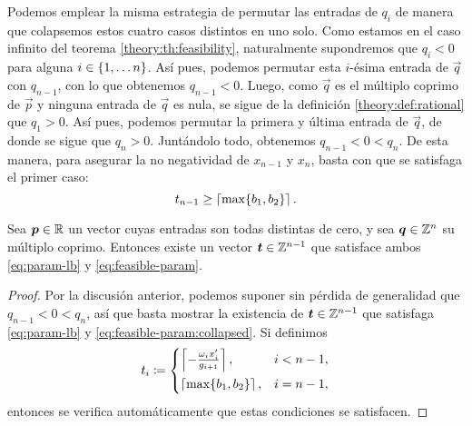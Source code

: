 Podemos emplear la misma estrategia de permutar las entradas de $q_i$ de manera que colapsemos estos
cuatro casos distintos en uno solo. Como estamos en el caso infinito del teorema
\ref{theory:th:feasibility}, naturalmente supondremos que $q_i < 0$ para alguna $i \in \lbrace 1,
\ldots n \rbrace$. Así pues, podemos permutar esta $i$-ésima entrada de $\vec{q}$ con $q_{n-1}$, con lo que
obtenemos $q_{n-1} < 0$. Luego, como $\vec{q}$ es el múltiplo coprimo de $\vec{p}$ y ninguna entrada
de $\vec{q}$ es nula, se sigue de la definición \ref{theory:def:rational} que $q_1 > 0$. Así pues,
podemos permutar la primera y última entrada de $\vec{q}$, de donde se sigue que $q_n > 0$.
Juntándolo todo, obtenemos $q_{n-1} < 0 < q_n$. De esta manera, para asegurar la no negatividad de
$x_{n-1}$ y $x_n$, basta con que se satisfaga el primer caso:
\begin{equation}
	\label{eq:feasible-param:collapsed}
	t_{n-1} \geq \left\lceil \max\lbrace b_1, b_2 \rbrace \right\rceil.
\end{equation}

\begin{lemma}
	\label{lemma:t-existence}
	Sea $\boldsymbol{p} \in \mathbb{R}$ un vector cuyas entradas son todas distintas de cero, y sea $\boldsymbol{q} \in
	\mathbb{Z}^n$ su múltiplo coprimo. Entonces existe un vector $\boldsymbol{t} \in \mathbb{Z}^{n-1}$ que satisface ambos
	\eqref{eq:param-lb} y \eqref{eq:feasible-param}.
\end{lemma}
\begin{proof}
	Por la discusión anterior, podemos suponer sin pérdida de generalidad que $q_{n-1} < 0 < q_n$,
	así que basta mostrar la existencia de  $\boldsymbol{t} \in \mathbb{Z}^{n-1}$ que satisfaga \eqref{eq:param-lb} y
	\eqref{eq:feasible-param:collapsed}. Si definimos
	\begin{equation*}
		t_i \coloneq \begin{cases}
			\left\lceil -\frac{\omega_ix_i'}{g_{i + 1}} \right\rceil, & i < n - 1, \\[0.5em]
			\left\lceil \max\lbrace b_1, b_2 \rbrace \right\rceil, & i = n - 1,
		\end{cases}
	\end{equation*}
	entonces se verifica automáticamente que estas condiciones se satisfacen.
\end{proof}

